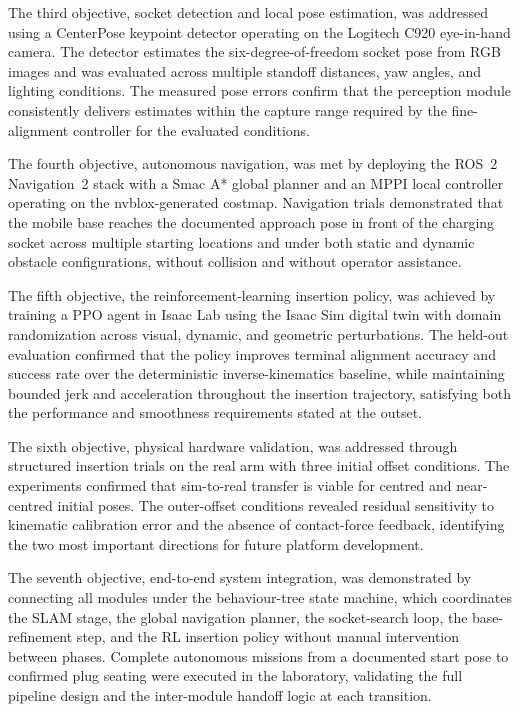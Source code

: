 \documentclass[10pt]{article}
\begin{document}
The third objective, socket detection and local pose estimation, was addressed using a CenterPose keypoint detector operating on the Logitech C920 eye-in-hand camera. The detector estimates the six-degree-of-freedom socket pose from RGB images and was evaluated across multiple standoff distances, yaw angles, and lighting conditions. The measured pose errors confirm that the perception module consistently delivers estimates within the capture range required by the fine-alignment controller for the evaluated conditions.

The fourth objective, autonomous navigation, was met by deploying the ROS~2 Navigation~2 stack with a Smac A* global planner and an MPPI local controller operating on the nvblox-generated costmap. Navigation trials demonstrated that the mobile base reaches the documented approach pose in front of the charging socket across multiple starting locations and under both static and dynamic obstacle configurations, without collision and without operator assistance.

The fifth objective, the reinforcement-learning insertion policy, was achieved by training a PPO agent in Isaac Lab using the Isaac Sim digital twin with domain randomization across visual, dynamic, and geometric perturbations. The held-out evaluation confirmed that the policy improves terminal alignment accuracy and success rate over the deterministic inverse-kinematics baseline, while maintaining bounded jerk and acceleration throughout the insertion trajectory, satisfying both the performance and smoothness requirements stated at the outset.

The sixth objective, physical hardware validation, was addressed through structured insertion trials on the real arm with three initial offset conditions. The experiments confirmed that sim-to-real transfer is viable for centred and near-centred initial poses. The outer-offset conditions revealed residual sensitivity to kinematic calibration error and the absence of contact-force feedback, identifying the two most important directions for future platform development.

The seventh objective, end-to-end system integration, was demonstrated by connecting all modules under the behaviour-tree state machine, which coordinates the SLAM stage, the global navigation planner, the socket-search loop, the base-refinement step, and the RL insertion policy without manual intervention between phases. Complete autonomous missions from a documented start pose to confirmed plug seating were executed in the laboratory, validating the full pipeline design and the inter-module handoff logic at each transition.
\end{document}

